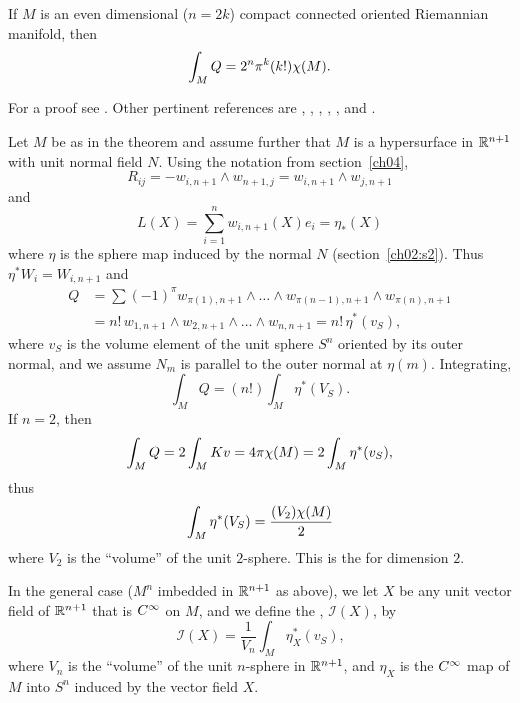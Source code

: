 \documentclass[../main]{subfiles}
\begin{document}
\begin{theorem} \label{thm:ch8.3.1}
    If $M$ is an even dimensional ($n=2 k$) compact connected oriented Riemannian manifold, then \[\int_M Q = 2^n \pi^k (k!) \chi(M).\]
\end{theorem}

For a proof see \cite{chern1951topics}. Other pertinent references are \cite{hopf1926uber}, \cite{Allendoerfer1940the}, \cite{Allendoerfer1943the}, \cite{fenchel1940on}, \cite{chern1945on}, and \cite{Allendoerfer1950the}.



Let $M$ be as in the theorem and assume further that $M$ is a hypersurface in $\mathbb{R}^{n+1}$ with unit normal field $N$. Using the notation from section~\ref{ch04}, \[R_{ij} = -w_{i, n+1} \wedge w_{n+1, j} = w_{i, n+1} \wedge w_{j, n+1}\] and \[L(X)= \sum_{i = 1}^{n} w_{i, n+1}(X) e_i = \eta_\ast(X)\] where $\eta$ is the sphere map induced by the normal $N$ (section~\ref{ch02:s2}). Thus $\eta^\ast W_i = W_{i, n+1}$ and
\begin{align*}
    Q &= \sum (-1)^\pi w_{\pi(1), n+1} \wedge \dots \wedge w_{\pi(n-1), n+1} \wedge w_{\pi(n), n+1} \\
    &= n!\, w_{1, n+1} \wedge w_{2, n+1} \wedge \dots \wedge w_{n, n+1} = n!\, \eta^\ast(v_S)\text{,}
\end{align*}%
where $v_S$ is the volume element of the unit sphere $S^n$ oriented by its outer normal, and we assume $N_m$ is parallel to the outer normal at $\eta(m)$. Integrating,\[\int_M Q = (n!) \int_{M} \eta^\ast (V_S).\] If $n=2$, then \[\int_M Q = 2\int_M Kv = 4\pi\chi(M) = 2\int_M \eta^\ast (v_S),\] thus \[\int_M \eta^\ast (V_S) = \dfrac{(V_2) \chi(M)}{2}\] where $V_2$ is the ``volume'' of the unit $2$-sphere. This is the  for dimension $2$.

In the general case ($M^{n}$ imbedded in $\mathbb{R}^{n+1}$ as above), we let $X$ be any unit vector field of $\mathbb{R}^{n+1}$ that is $C^\infty$ on $M$, and we define the , $\mathcal{I}(X)$, by
\begin{equation}\tag{8}\label{eq:ch8.3.3}
    \mathcal{I}(X) = \frac{1}{V_n} \int_M \eta_X^\ast(v_S)\text{,}
\end{equation}%
where $V_n$ is the ``volume'' of the unit $n$-sphere in $\mathbb{R}^{n+1}$, and $\eta_X$ is the $C^\infty$ map of $M$ into $S^n$ induced by the vector field $X$.
\end{document}
